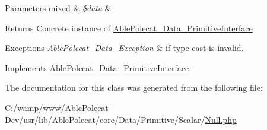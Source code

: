 \begin{DoxyParams}[1]{Parameters}
mixed & {\em \$data} & \\
\hline
\end{DoxyParams}
\begin{DoxyReturn}{Returns}
Concrete instance of \hyperlink{interface_able_polecat___data___primitive_interface}{Able\+Polecat\+\_\+\+Data\+\_\+\+Primitive\+Interface} 
\end{DoxyReturn}

\begin{DoxyExceptions}{Exceptions}
{\em \hyperlink{class_able_polecat___data___exception}{Able\+Polecat\+\_\+\+Data\+\_\+\+Exception}} & if type cast is invalid. \\
\hline
\end{DoxyExceptions}


Implements \hyperlink{interface_able_polecat___data___primitive_interface_a68640750b79d1cdda3cddcece68a207e}{Able\+Polecat\+\_\+\+Data\+\_\+\+Primitive\+Interface}.



The documentation for this class was generated from the following file\+:\begin{DoxyCompactItemize}
\item 
C\+:/wamp/www/\+Able\+Polecat-\/\+Dev/usr/lib/\+Able\+Polecat/core/\+Data/\+Primitive/\+Scalar/\hyperlink{_null_8php}{Null.\+php}\end{DoxyCompactItemize}
